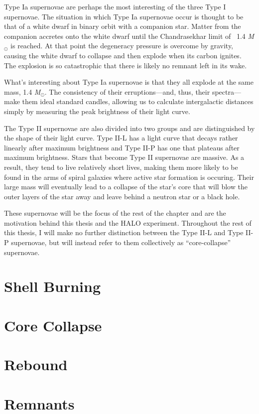 		Type Ia supernovae are perhaps the most interesting of the three Type I supernovae. The situation in which Type Ia supernovae occur is thought to be that of a white dwarf in binary orbit with a companion star. Matter from the companion accretes onto the white dwarf until the Chandrasekhar limit of \ 1.4 \emph{M}$_\odot$ is reached. At that point the degeneracy pressure is overcome by gravity, causing the white dwarf to collapse and then explode when its carbon ignites. The explosion is so catastrophic that there is likely no remnant left in its wake. 

		What's interesting about Type Ia supernovae is that they all explode at the same mass, 1.4 \emph{M}$_\odot$. The consistency of their erruptions---and, thus, their spectra---make them ideal standard candles, allowing us to calculate intergalactic distances simply by measuring the peak brightness of their light curve.

		The Type II supernovae are also divided into two groups and are distinguished by the shape of their light curve. Type II-L has a light curve that decays rather linearly after maximum brightness and Type II-P has one that plateaus after maximum brightness. Stars that become Type II supernovae are massive. As a result, they tend to live relatively short lives, making them more likely to be found in the arms of spiral galaxies where active star formation is occuring. Their large mass will eventually lead to a collapse of the star's core that will blow the outer layers of the star away and leave behind a neutron star or a black hole.

		These supernovae will be the focus of the rest of the chapter and are the motivation behind this thesis and the HALO experiment. Throughout the rest of this thesis, I will make no further distinction between the Type II-L and Type II-P supernovae, but will instead refer to them collectively as ``core-collapse'' supernovae.
	\section{Shell Burning}
		\filler
	\section{Core Collapse}
		\filler
	\section{Rebound}
		\filler
	\section{Remnants}
		\filler


